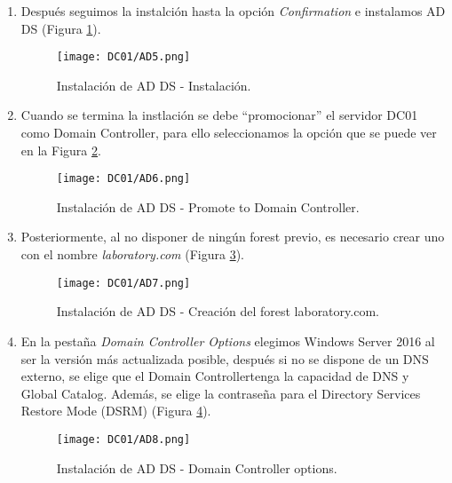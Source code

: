 \begin{enumerate}
\item Después seguimos la instalción hasta la opción {\it Confirmation} e instalamos AD DS (Figura \ref{DC01-AD5}).
\begin{figure}[H] %
\begin{center}
\texttt{[image: DC01/AD5.png]}
\end{center}
\caption{Instalación de AD DS - Instalación.}
\label{DC01-AD5}
\end{figure}


\item Cuando se termina la instlación se debe ``promocionar'' el servidor DC01 como Domain Controller, para ello seleccionamos la opción que se puede ver en la Figura \ref{DC01-AD6}.
\begin{figure}[H] %
\begin{center}
\texttt{[image: DC01/AD6.png]}
\end{center}
\caption{Instalación de AD DS - Promote to Domain Controller.}
\label{DC01-AD6}
\end{figure}


\item Posteriormente, al no disponer de ningún forest previo, es necesario crear uno con el nombre {\it laboratory.com} (Figura \ref{DC01-AD7}). 
\begin{figure}[H] %
\begin{center}
\texttt{[image: DC01/AD7.png]}
\end{center}
\caption{Instalación de AD DS - Creación del forest laboratory.com.}
\label{DC01-AD7}
\end{figure}


\item En la pestaña {\it Domain Controller Options} elegimos Windows Server 2016 al ser la versión más actualizada posible, después si no se dispone de un DNS externo, se elige que el Domain Controllertenga la capacidad de DNS y Global Catalog. Además, se elige la contraseña para el Directory Services Restore Mode (DSRM) (Figura \ref{DC01-AD8}).
\begin{figure}[H] %
\begin{center}
\texttt{[image: DC01/AD8.png]}
\end{center}
\caption{Instalación de AD DS - Domain Controller options.}
\label{DC01-AD8}
\end{figure}



\end{enumerate}
